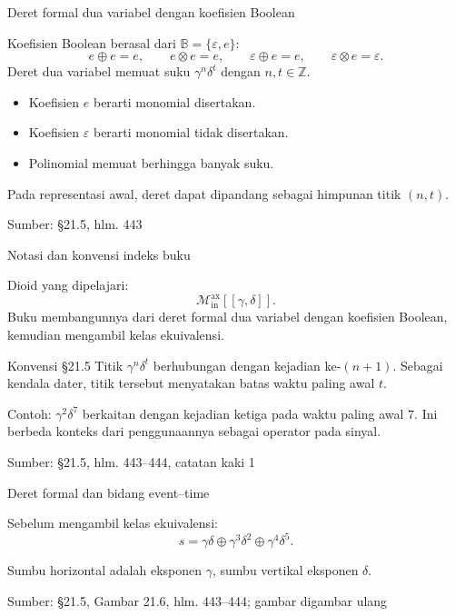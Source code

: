 \documentclass[aspectratio=169,11pt]{beamer}
\newcommand{\source}[1]{%
    \vfill
    \hfill{\tiny\color{gray}Sumber: #1}
}
\newcommand{\eps}{\varepsilon}
\newcommand{\D}{\mathcal{M}_{\mathrm{in}}^{\mathrm{ax}}[[\gamma,\delta]]}
\begin{document}
\begin{frame}{Deret formal dua variabel dengan koefisien Boolean}

Koefisien Boolean berasal dari $\mathbb B=\{\eps,e\}$:
\[
e\oplus e=e,\qquad e\otimes e=e,\qquad
\eps\oplus e=e,\qquad\eps\otimes e=\eps.
\]
Deret dua variabel memuat suku $\gamma^n\delta^t$ dengan $n,t\in\mathbb Z$.
\begin{itemize}
\item Koefisien $e$ berarti monomial disertakan.
\item Koefisien $\eps$ berarti monomial tidak disertakan.
\item Polinomial memuat berhingga banyak suku.
\end{itemize}
Pada representasi awal, deret dapat dipandang sebagai himpunan titik $(n,t)$.

\source{\S21.5, hlm. 443}
\end{frame}
\begin{frame}{Notasi dan konvensi indeks buku}


Dioid yang dipelajari:
\[
\D.
\]
Buku membangunnya dari deret formal dua variabel dengan koefisien Boolean,
kemudian mengambil kelas ekuivalensi.
\begin{block}{Konvensi \S21.5}
Titik $\gamma^n\delta^t$ berhubungan dengan kejadian ke-$(n+1)$.
Sebagai kendala dater, titik tersebut menyatakan batas waktu paling awal $t$.
\end{block}
Contoh: $\gamma^2\delta^7$ berkaitan dengan kejadian ketiga pada waktu paling awal $7$.
Ini berbeda konteks dari penggunaannya sebagai operator pada sinyal.

\source{\S21.5, hlm. 443--444, catatan kaki 1}

\end{frame}
\begin{frame}{Deret formal dan bidang event--time}


Sebelum mengambil kelas ekuivalensi:
\[
s=\gamma\delta\oplus\gamma^3\delta^2\oplus\gamma^4\delta^5.
\]
\begin{center}\end{center}
Sumbu horizontal adalah eksponen $\gamma$, sumbu vertikal eksponen $\delta$.

\source{\S21.5, Gambar 21.6, hlm. 443--444; gambar digambar ulang}

\end{frame}
\end{document}
